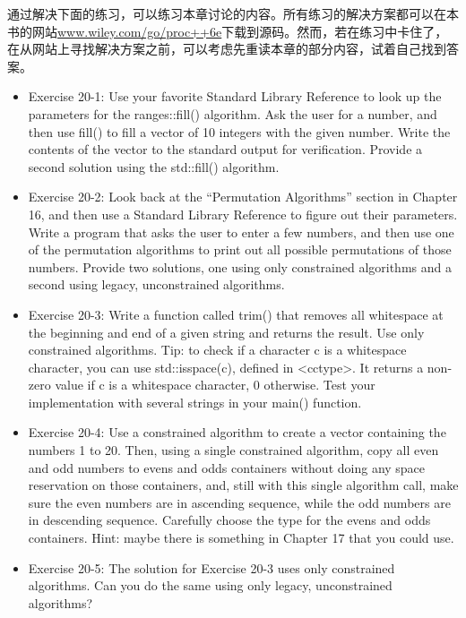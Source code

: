 通过解决下面的练习，可以练习本章讨论的内容。所有练习的解决方案都可以在本书的网站\url{www.wiley.com/go/proc++6e}下载到源码。然而，若在练习中卡住了，在从网站上寻找解决方案之前，可以考虑先重读本章的部分内容，试着自己找到答案。

\begin{itemize}
\item
Exercise 20-1: Use your favorite Standard Library Reference to look up the parameters for the ranges::fill() algorithm. Ask the user for a number, and then use fill() to fill a vector of 10 integers with the given number. Write the contents of the vector to the standard output for verification. Provide a second solution using the std::fill() algorithm.

\item
Exercise 20-2: Look back at the “Permutation Algorithms” section in Chapter 16, and then use a Standard Library Reference to figure out their parameters. Write a program that asks the user to enter a few numbers, and then use one of the permutation algorithms to print out all possible permutations of those numbers. Provide two solutions, one using only constrained algorithms and a second using legacy, unconstrained algorithms.

\item
Exercise 20-3: Write a function called trim() that removes all whitespace at the beginning and end of a given string and returns the result. Use only constrained algorithms. Tip: to check if a character c is a whitespace character, you can use std::isspace(c), defined in <cctype>. It returns a non-zero value if c is a whitespace character, 0 otherwise. Test your implementation with several strings in your main() function.

\item
Exercise 20-4: Use a constrained algorithm to create a vector containing the numbers 1 to 20. Then, using a single constrained algorithm, copy all even and odd numbers to evens and odds containers without doing any space reservation on those containers, and, still with this single algorithm call, make sure the even numbers are in ascending sequence, while the odd numbers are in descending sequence. Carefully choose the type for the evens and odds containers. Hint: maybe there is something in Chapter 17 that you could use.

\item
Exercise 20-5: The solution for Exercise 20-3 uses only constrained algorithms. Can you do the same using only legacy, unconstrained algorithms?
\end{itemize}












